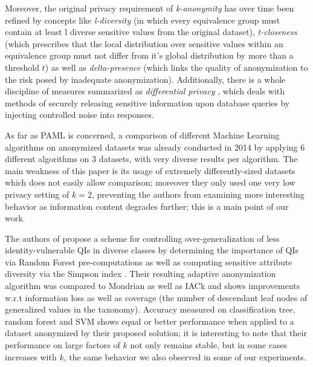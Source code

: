 \documentclass{llncs}
\begin{document}
Moreover, the original privacy requirement of \textit{k-anonymity} \cite{Sweeney:2002:k-Anonymity} has over time been refined by concepts like \textit{l-diversity} \cite{MachanavajjhalaEtAl:2007:l-Diversity} (in which every equivalence group must contain at least l diverse sensitive values from the original dataset), \textit{t-closeness} \cite{LiEtAl:2007:t-closeness} (which prescribes that the local distribution over sensitive values within an equivalence group must not differ from it's global distribution by more than a threshold $t$) as well as \textit{delta-presence} \cite{NergizClifton:2010:Delta-Presence} (which links the quality of anonymization to the risk posed by inadequate anonymization). Additionally, there is a whole discipline of measures summarized as \textit{differential privacy} \cite{dwork2008differential}, which deals with methods of securely releasing sensitive information upon database queries by injecting controlled noise into responses.

As far as PAML is concerned, a comparison of different Machine Learning algorithms on anonymized datasets was already conducted in 2014 \cite{Wimmer2014} by applying 6 different algorithms on 3 datasets, with very diverse results per algorithm. The main weakness of this paper is its usage of extremely differently-sized datasets which does not easily allow comparison; moreover they only used one very low privacy setting of $k=2$, preventing the authors from examining more interesting behavior as information content degrades further; this is a main point of our work.

The authors of \cite{Majeed2017} propose a scheme for controlling over-generalization of less identity-vulnerable QIs in diverse classes by determining the importance of QIs via Random Forest pre-computations as well as computing sensitive attribute diversity via the Simpson index \cite{simpson1949measurement}. Their resulting adaptive anonymization algorithm was compared to Mondrian \cite{lefevre2006mondrian} as well as IACk \cite{li2011information} and shows improvements w.r.t information loss as well as coverage (the number of descendant leaf nodes of generalized values in the taxonomy). Accuracy measured on classification tree, random forest and SVM shows equal or better performance when applied to a dataset anonymized by their proposed solution; it is interesting to note that their performance on large factors of $k$ not only remains stable, but in some cases increases with $k$, the same behavior we also observed in some of our experiments.
\end{document}
